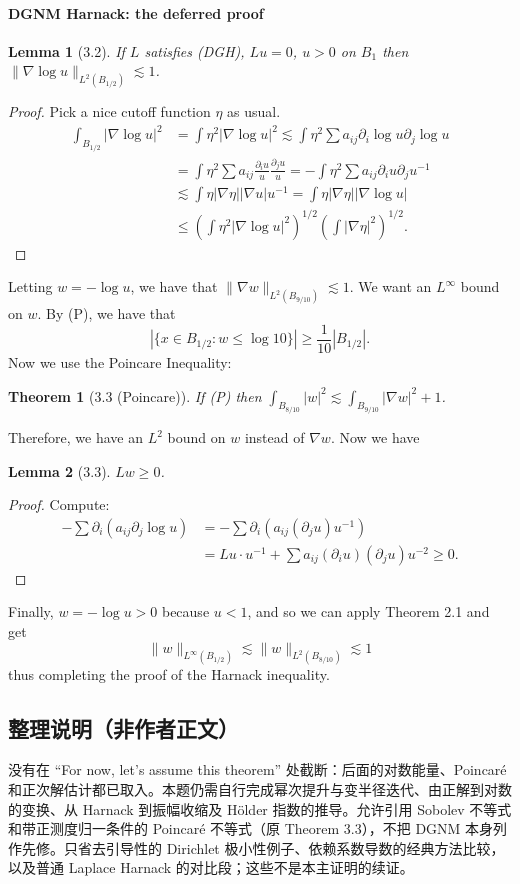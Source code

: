\documentclass[UTF8,11pt]{ctexart}
\newtheorem*{theorem}{Theorem}
\newtheorem*{lemma}{Lemma}
\theoremstyle{definition}
\begin{document}
\paragraph{DGNM Harnack: the deferred proof}
\begin{lemma}[3.2]
If $L$ satisfies (DGH), $Lu=0$, $u>0$ on $B_1$ then $\|\nabla\log u\|_{L^2(B_{1/2})}\lesssim1$.
\end{lemma}
\begin{proof}
Pick a nice cutoff function $\eta$ as usual.
\begin{align*}
\int_{B_{1/2}}|\nabla\log u|^2&=\int\eta^2|\nabla\log u|^2\lesssim\int\eta^2\sum a_{ij}\partial_i\log u\partial_j\log u\\
&=\int\eta^2\sum a_{ij}\frac{\partial_i u}{u}\frac{\partial_j u}{u}
=-\int\eta^2\sum a_{ij}\partial_i u\partial_j u^{-1}\\
&\lesssim\int\eta|\nabla\eta||\nabla u|u^{-1}=\int\eta|\nabla\eta||\nabla\log u|\\
&\leq\left(\int\eta^2|\nabla\log u|^2\right)^{1/2}\left(\int|\nabla\eta|^2\right)^{1/2}.
\end{align*}
\end{proof}
Letting $w=-\log u$, we have that $\|\nabla w\|_{L^2(B_{9/10})}\lesssim1$. We want an $L^\infty$ bound on $w$. By (P), we have that
\[|\{x\in B_{1/2}:w\leq\log10\}|\geq\frac1{10}|B_{1/2}|.\]
Now we use the Poincare Inequality:
\begin{theorem}[3.3 (Poincare)]
If (P) then $\int_{B_{8/10}}|w|^2\lesssim\int_{B_{9/10}}|\nabla w|^2+1$.
\end{theorem}
Therefore, we have an $L^2$ bound on $w$ instead of $\nabla w$. Now we have
\begin{lemma}[3.3]
$Lw\geq0$.
\end{lemma}
\begin{proof}
Compute:
\begin{align*}
-\sum\partial_i(a_{ij}\partial_j\log u)&=-\sum\partial_i(a_{ij}(\partial_j u)u^{-1})\\
&=Lu\cdot u^{-1}+\sum a_{ij}(\partial_i u)(\partial_j u)u^{-2}\geq0.
\end{align*}
\end{proof}
Finally, $w=-\log u>0$ because $u<1$, and so we can apply Theorem 2.1 and get
\[\|w\|_{L^\infty(B_{1/2})}\lesssim\|w\|_{L^2(B_{8/10})}\lesssim1\]
thus completing the proof of the Harnack inequality.
\subsection*{整理说明（非作者正文）}
没有在 ``For now, let's assume this theorem'' 处截断：后面的对数能量、Poincar\'e 和正次解估计都已取入。本题仍需自行完成幂次提升与变半径迭代、由正解到对数的变换、从 Harnack 到振幅收缩及 Hölder 指数的推导。允许引用 Sobolev 不等式和带正测度归一条件的 Poincar\'e 不等式（原 Theorem 3.3），不把 DGNM 本身列作先修。只省去引导性的 Dirichlet 极小性例子、依赖系数导数的经典方法比较，以及普通 Laplace Harnack 的对比段；这些不是本主证明的续证。
\end{document}

